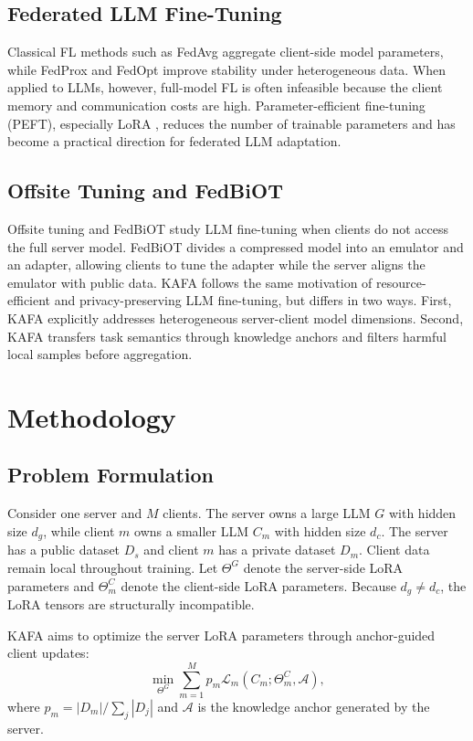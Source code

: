 \documentclass[conference]{IEEEtran}
\begin{document}
\subsection{Federated LLM Fine-Tuning}
Classical FL methods such as FedAvg \cite{fedavg} aggregate client-side model parameters, while FedProx \cite{fedprox} and FedOpt \cite{fedopt} improve stability under heterogeneous data. When applied to LLMs, however, full-model FL is often infeasible because the client memory and communication costs are high. Parameter-efficient fine-tuning (PEFT), especially LoRA \cite{lora}, reduces the number of trainable parameters and has become a practical direction for federated LLM adaptation.

\subsection{Offsite Tuning and FedBiOT}
Offsite tuning \cite{offsite} and FedBiOT \cite{fedbiot} study LLM fine-tuning when clients do not access the full server model. FedBiOT divides a compressed model into an emulator and an adapter, allowing clients to tune the adapter while the server aligns the emulator with public data. KAFA follows the same motivation of resource-efficient and privacy-preserving LLM fine-tuning, but differs in two ways. First, KAFA explicitly addresses heterogeneous server-client model dimensions. Second, KAFA transfers task semantics through knowledge anchors and filters harmful local samples before aggregation.

\section{Methodology}
\subsection{Problem Formulation}
Consider one server and $M$ clients. The server owns a large LLM $G$ with hidden size $d_g$, while client $m$ owns a smaller LLM $C_m$ with hidden size $d_c$. The server has a public dataset $D_s$ and client $m$ has a private dataset $D_m$. Client data remain local throughout training. Let $\Theta^G$ denote the server-side LoRA parameters and $\Theta_m^C$ denote the client-side LoRA parameters. Because $d_g \ne d_c$, the LoRA tensors are structurally incompatible.

KAFA aims to optimize the server LoRA parameters through anchor-guided client updates:
\begin{equation}
\min_{\Theta^G} \sum_{m=1}^{M} p_m \mathcal{L}_m(C_m; \Theta_m^C, \mathcal{A}),
\end{equation}
where $p_m=|D_m|/\sum_j |D_j|$ and $\mathcal{A}$ is the knowledge anchor generated by the server.
\end{document}
